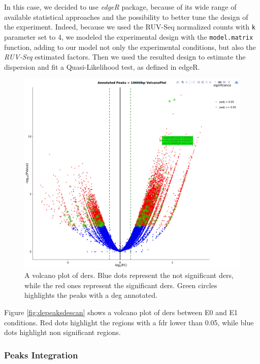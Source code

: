 In this case, we decided to use \textit{edgeR} package, because of its wide range of  available statistical approaches and the possibility to better tune the design of the experiment. 
Indeed, because we used the RUV-Seq normalized counts with \lstinline!k! parameter set to 4, we modeled the experimental design with the \lstinline!model.matrix! function, adding to our model not only the experimental conditions, but also the \textit{RUV-Seq} estimated factors.
Then we used the resulted design to estimate the dispersion and fit a Quasi-Likelihood test, as defined in edgeR\cite{Robinson2009}.
 
\begin{figure}[H]
\centering
\includegraphics[width=\textwidth, height=\textheight, keepaspectratio]{img/descan2/Annotated_depeaks_degenes.png}
\caption[Annotated Differential Enrichment Regions Volcano]{A volcano plot of \glspl{der}. Blue dots represent the not significant \glspl{der}, while the red ones represent the significant \glspl{der}. Green circles highlights the peaks with a \gls{deg} annotated.}
\label{fig:depeakdegenessdescan}
\centering
\end{figure}

Figure \ref{fig:depeaksdescan} shows a volcano plot of \glspl{der} between E0 and E1 conditions.
Red dots highlight the regions with a \gls{fdr}\cite{Benjamini1995} lower than 0.05, while blue dots highlight non significant regions.

\subsubsection{Peaks Integration}

